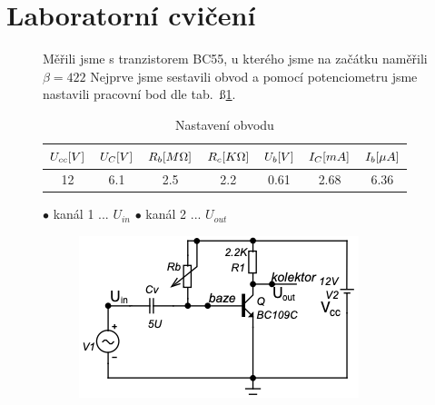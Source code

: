 \documentclass{article}
\newcommand \tab[1]
{ tab.~ß\ref{#1}}
\begin{document}
\newpage
\section{Laboratorní cvičení}

\begin{figure}[H]
	\begin{minipage}[t]{0.6\textwidth}
    Měřili jsme s tranzistorem BC55, u kterého jsme na začátku naměřili \(\beta = 422\)
    Nejprve jsme sestavili obvod a pomocí potenciometru jsme nastavili pracovní bod dle \tab{tab_pracovni_bod}.
    \begin{table}[H]
      \begin{tabular}{|c|c|c|c|c||c|c|} 
        \hline
         \(U_{cc}\-[V]\) & \(U_{C}\-[V]\)  & \(R_b\-[M\Omega]\) &	\(R_c\-[K\Omega]\) & \(U_{b}\-[V]\) & \(I_{C}\-[mA]\) & \(I_{b}\-[\mu A]\)  \\ \hline
         12              & 6.1             & 2.5                & 2.2                & 0.61           & 2.68            & 6.36                \\ \hline
      \end{tabular}
      \caption{\label{tab_pracovni_bod} Nastavení obvodu}
    \end{table}
   	\(\bullet\) kanál 1 ... \(U_{in}\)  \qquad 	\(\bullet\) kanál 2 ... \(U_{out}\)
  \end{minipage}
  \hfill
	\begin{minipage}[t]{0.4\textwidth}
    \begin{figure}[H]
      \includegraphics[width=\textwidth]{obvod-z-laborky.png}
      \caption{\label{obvod_z_laborky}}
    \end{figure}
  \end{minipage}
\end{figure}
\end{document}
